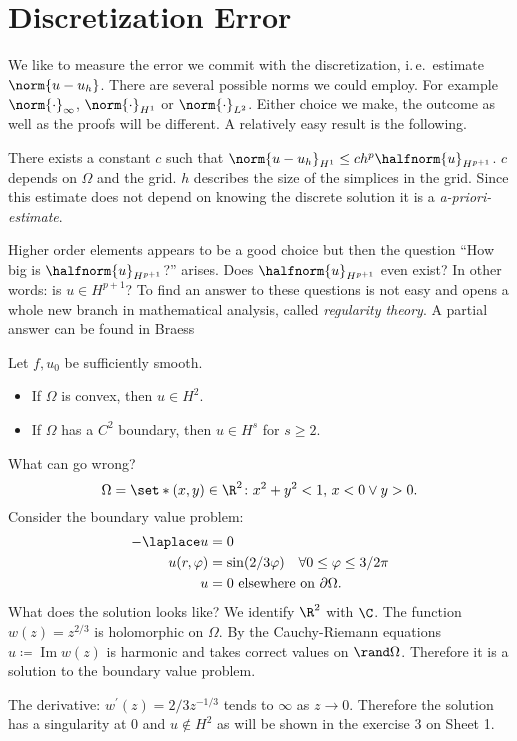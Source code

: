 \section{Discretization Error}
We like to measure the error we commit with the discretization, i.\,e.\ estimate $\norm{u-u_h}$. There are several possible norms we could employ. For example $\norm{\cdot}_\infty$, $\norm{\cdot}_{H^1}$ or $\norm{\cdot}_{L^2}$. Either choice we make, the outcome as well as the proofs will be different. A relatively easy result is the following.
\begin{theorem}
  There exists a constant $c$ such that $\norm{u-u_h}_{H^1}\leq ch^p\halfnorm{u}_{H^{p+1}}$. $c$ depends on $\Omega$ and the grid. $h$ describes the size of the simplices in the grid. Since this estimate does not depend on knowing the discrete solution it is a \textit{a-priori-estimate}.
\end{theorem}
Higher order elements appears to be a good choice but then
the question \enquote{How big is $\halfnorm{u}_{H^{p+1}}$?} arises. Does $\halfnorm{u}_{H^{p+1}}$ even exist? In other words: is $u\in H^{p+1}$? To find an answer to these questions is not easy and opens a whole new branch in mathematical analysis, called \textit{regularity theory}. A partial answer can be found in Braess %
\begin{theorem}%
Let $f,u_0$ be sufficiently smooth.
\begin{itemize}
  \item If $\Omega$ is convex, then $u\in H^2$.
  \item If $\Omega$ has a $C^2$ boundary, then $u\in H^s$ for $s\geq 2$.
\end{itemize}
\end{theorem}
\begin{example}
What can go wrong?
\begin{equation*}
  \Omega=\set*{(x,y)\in\R^2\colon x^2+y^2<1,\,x<0\lor y>0}.
\end{equation*}
Consider the boundary value problem:
\begin{align*}
	-\laplace u&=0\\
	u(r,\varphi)&=\sin(2/3\varphi)\quad \forall 0\leq\varphi\leq3/2\pi \\
	u&=0 \text{ elsewhere on } \partial\Omega.
\end{align*}
What does the solution looks like? We identify $\R^2$ with $\C$. The function $w(z)=z^{2/3}$ is holomorphic on $\Omega$. By the Cauchy-Riemann equations $u \coloneqq \operatorname{Im}w(z)$ is harmonic and takes correct values on $\rand\Omega$. Therefore it is a solution to the boundary value problem.

The derivative: $w^\prime(z)=2/3z^{-1/3}$ tends to $\infty$ as $z\to 0$. Therefore the solution has a singularity at $0$ and $u\notin H^2$ as will be shown in the exercise 3 on Sheet 1.
\end{example}
